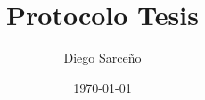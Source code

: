 



\title{Protocolo Tesis}
\author{Diego Sarceño}
\date{\today}






\renewcommand{\labelenumii}{\arabic{enumi}.\arabic{enumii}}
\renewcommand{\labelenumiii}{\arabic{enumi}.\arabic{enumii}.\arabic{enumiii}}
\renewcommand{\labelenumiv}{\arabic{enumi}.\arabic{enumii}.\arabic{enumiii}.\arabic{enumiv}}

\begin{titlepage}

\end{titlepage}

\tableofcontents
\pagebreak





\pagebreak

\pagebreak

\pagebreak

\pagebreak

\pagebreak

\pagebreak

\pagebreak
\vspace*{\fill}
\nocite{*}

\vspace*{\fill}
\pagebreak
%






